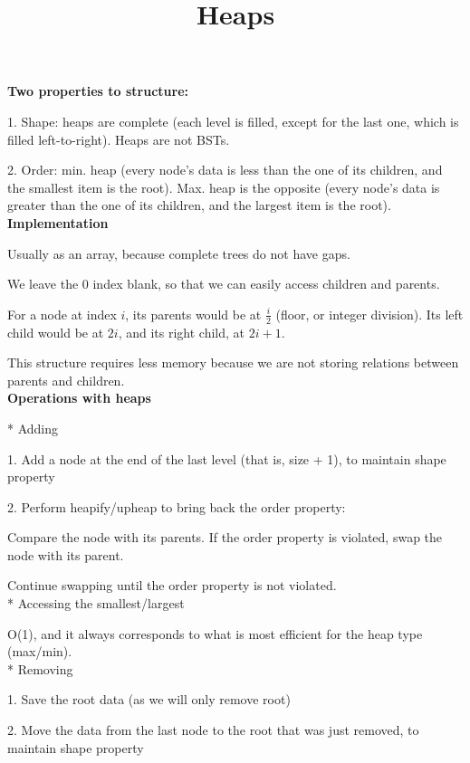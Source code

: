 \documentclass{exam}
\title{Heaps}
\date{}
\begin{document}
	\maketitle
	\textbf{Two properties to structure:}
	
	1. Shape: heaps are complete (each level is filled, except for the last one, which is filled left-to-right). Heaps are not BSTs.
	
	2. Order: min. heap (every node's data is less than the one of its children, and the smallest item is the root). Max. heap is the opposite (every node's data is greater than the one of its children, and the largest item is the root).\\
	
	\textbf{Implementation}
	
	Usually as an array, because complete trees do not have gaps.
	
	We leave the 0 index blank, so that we can easily access children and parents.
	
	For a node at index $i$, its parents would be at $\frac{i}{2}$ (floor, or integer division). Its left child would be at $2i$, and its right child, at $2i + 1$.
	
	This structure requires less memory because we are not storing relations between parents and children.\\
	
	\textbf{Operations with heaps}
	
	* Adding
	
	1. Add a node at the end of the last level (that is, size + 1), to maintain shape property
	
	2. Perform heapify/upheap to bring back the order property:
	
	Compare the node with its parents. If the order property is violated, swap the node with its parent.
	
	Continue swapping until the order property is not violated.\\
	
	* Accessing the smallest/largest
	
	O(1), and it always corresponds to what is most efficient for the heap type (max/min).\\
	
	* Removing
	
	1. Save the root data (as we will only remove root)
	
	2. Move the data from the last node to the root that was just removed, to maintain shape property
	
\end{document}
